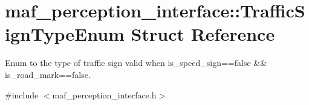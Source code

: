 \hypertarget{structmaf__perception__interface_1_1TrafficSignTypeEnum}{}\section{maf\+\_\+perception\+\_\+interface\+:\+:Traffic\+Sign\+Type\+Enum Struct Reference}
\label{structmaf__perception__interface_1_1TrafficSignTypeEnum}


Enum to the type of traffic sign  valid when is\+\_\+speed\+\_\+sign==false \&\& is\+\_\+road\+\_\+mark==false.  




{\ttfamily \#include $<$maf\+\_\+perception\+\_\+interface.\+h$>$}

